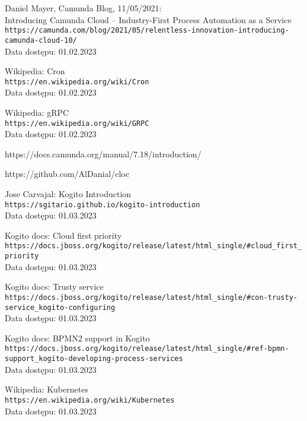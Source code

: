 \documentclass[declaration,shortabstract,mgr]{iithesis}
\begin{document}
\begin{thebibliography}{1}
Daniel Mayer, Camunda Blog, 11/05/2021: \\
Introducing Camunda Cloud -- Industry-First Process Automation as a Service \\
\texttt{https://camunda.com/blog/2021/05/relentless-innovation-introducing-camunda-cloud-10/} \\
Data dostępu: 01.02.2023

Wikipedia: Cron \\
\texttt{https://en.wikipedia.org/wiki/Cron} \\
Data dostępu: 01.02.2023

Wikipedia: gRPC \\
\texttt{https://en.wikipedia.org/wiki/GRPC} \\
Data dostępu: 01.02.2023








https://docs.camunda.org/manual/7.18/introduction/

https://github.com/AlDanial/cloc


Jose Carvajal: Kogito Introduction \\
\texttt{https://sgitario.github.io/kogito-introduction} \\
Data dostępu: 01.03.2023

Kogito docs: Cloud first priority \\
\texttt{https://docs.jboss.org/kogito/release/latest/html\_single/\#cloud\_first\_priority} \\
Data dostępu: 01.03.2023

Kogito docs: Trusty service \\
\texttt{https://docs.jboss.org/kogito/release/latest/html\_single/\#con-trusty-service\_kogito-configuring} \\
Data dostępu: 01.03.2023

Kogito docs: BPMN2 support in Kogito \\
\texttt{https://docs.jboss.org/kogito/release/latest/html\_single/\#ref-bpmn-support\_kogito-developing-process-services} \\
Data dostępu: 01.03.2023

Wikipedia: Kubernetes \\
\texttt{https://en.wikipedia.org/wiki/Kubernetes} \\
Data dostępu: 01.03.2023





\end{thebibliography}
\end{document}
